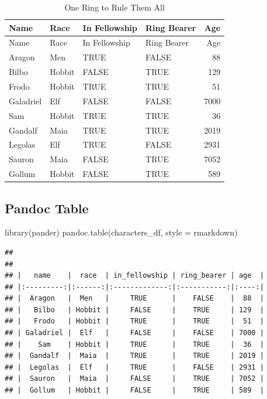 \documentclass[
]{article}
\newenvironment{Shaded}{\begin{snugshade}}{\end{snugshade}}
\newcommand{\AttributeTok}[1]{\textcolor[rgb]{0.77,0.63,0.00}{#1}}
\newcommand{\FunctionTok}[1]{\textcolor[rgb]{0.00,0.00,0.00}{#1}}
\newcommand{\NormalTok}[1]{#1}
\newcommand{\StringTok}[1]{\textcolor[rgb]{0.31,0.60,0.02}{#1}}
\begin{document}
\begin{longtable}[]{@{}llllr@{}}
\caption{One Ring to Rule Them All}\tabularnewline
\toprule()
Name & Race & In Fellowship & Ring Bearer & Age \\
\midrule()
\endfirsthead
\toprule()
Name & Race & In Fellowship & Ring Bearer & Age \\
\midrule()
\endhead
Aragon & Men & TRUE & FALSE & 88 \\
Bilbo & Hobbit & FALSE & TRUE & 129 \\
Frodo & Hobbit & TRUE & TRUE & 51 \\
Galadriel & Elf & FALSE & FALSE & 7000 \\
Sam & Hobbit & TRUE & TRUE & 36 \\
Gandalf & Maia & TRUE & TRUE & 2019 \\
Legolas & Elf & TRUE & FALSE & 2931 \\
Sauron & Maia & FALSE & TRUE & 7052 \\
Gollum & Hobbit & FALSE & TRUE & 589 \\
\bottomrule()
\end{longtable}

\hypertarget{pandoc-table}{%
\subsection{Pandoc Table}\label{pandoc-table}}

\begin{Shaded}
\begin{Highlighting}[]
\FunctionTok{library}\NormalTok{(pander)}
\FunctionTok{pandoc.table}\NormalTok{(characters\_df, }\AttributeTok{style =} \StringTok{\textquotesingle{}rmarkdown\textquotesingle{}}\NormalTok{)}
\end{Highlighting}
\end{Shaded}

\begin{verbatim}
## 
## 
## |   name    |  race  | in_fellowship | ring_bearer | age  |
## |:---------:|:------:|:-------------:|:-----------:|:----:|
## |  Aragon   |  Men   |     TRUE      |    FALSE    |  88  |
## |   Bilbo   | Hobbit |     FALSE     |    TRUE     | 129  |
## |   Frodo   | Hobbit |     TRUE      |    TRUE     |  51  |
## | Galadriel |  Elf   |     FALSE     |    FALSE    | 7000 |
## |    Sam    | Hobbit |     TRUE      |    TRUE     |  36  |
## |  Gandalf  |  Maia  |     TRUE      |    TRUE     | 2019 |
## |  Legolas  |  Elf   |     TRUE      |    FALSE    | 2931 |
## |  Sauron   |  Maia  |     FALSE     |    TRUE     | 7052 |
## |  Gollum   | Hobbit |     FALSE     |    TRUE     | 589  |
\end{verbatim}
\end{document}
